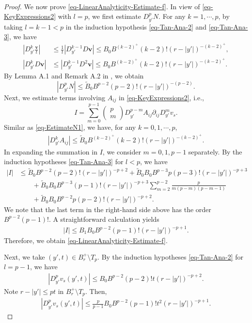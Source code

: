 \documentclass[11pt,reqno]{amsart}
\renewcommand{\leq}{\leqslant}
\theoremstyle{definition}
\numberwithin{equation}{section}
\begin{document}
\begin{proof}
We now prove \eqref{eq-LinearAnalyticity-Estimate-f}. In view of \eqref{eq-KeyExpressions2} 
with $l=p$, we first estimate $D_{y'}^pN$. 
For any $k=1, \cdots, p$, by taking $l=k-1<p$ in the induction hypothesis 
\eqref{eq-Tan-Ana-2} and \eqref{eq-Tan-Ana-3}, we have 
\begin{align}
\left|D_{y'}^k\frac{\mathbf v}{t}\right|&\leq\frac1t\left|D_{y'}^{k-1}D \mathbf v\right|
\leq B_0B^{(k-2)^+}(k-2)!(r-|y'|)^{-(k-2)^+},\\
|D_{y'}^kD \mathbf v|&\leq|D_{y'}^{k-1}D^2 \mathbf v|\leq B_0B^{(k-2)^+}(k-2)!(r-|y'|)^{-(k-2)^+}.
\end{align}
By Lemma A.1 and Remark A.2 in \cite{HanJiang1}, we obtain 
\begin{equation}\label{eq-EstimateN1}|D^p_{y'}N|\leq \widetilde B_0B^{p-2}(p-2)!(r-|y'|)^{-(p-2)}.
\end{equation}
Next, we estimate terms involving $A_{ij}$ in \eqref{eq-KeyExpressions2}, i.e., 
\begin{equation}\label{eq-estimate-I}I=\sum_{m=0}^{p-1}
\left(\begin{matrix}p\\m\end{matrix}\right)D_{y'}^{p-m}A_{ij} \partial_{ij}D_{y'}^mv_s.\end{equation}
Similar as \eqref{eq-EstimateN1}, we have, for any $k=0, 1, \cdots, p$, 
\begin{align}|D^k_{y'}A_{ij}|\leq \widetilde B_0B^{(k-2)^+}(k-2)!(r-|y'|)^{-(k-2)^+}.\end{align}
In expanding the summation in $I$, we consider $m=0, 1, p-1$ separately. 
By  the induction hypotheses 
\eqref{eq-Tan-Ana-3} for $l<p$, we have 
\begin{align} 
|I|&\leq \widetilde B_0B^{p-2}(p-2)!(r-|y'|)^{-p+2}+\widetilde B_0B_0B^{p-3}p(p-3)!(r-|y'|)^{-p+3}\\
&\qquad +\widetilde B_0B_0B^{p-3}(p-1)!(r-|y'|)^{-p+3}
\sum_{m=2}^{p-2}\frac{p}{m(p-m)(p-m-1)}\\
&\qquad+\widetilde B_0B_0B^{p-2}p(p-2)!(r-|y'|)^{-p+2}.\end{align} 
We note that the last term in the right-hand side above has the order $B^{p-2}(p-1)!$. 
A straightforward calculation yields 
\begin{align}|I|\leq B_1B_0B^{p-2}(p-1)!(r-|y'|)^{-p+1}.\end{align}
Therefore, we obtain \eqref{eq-LinearAnalyticity-Estimate-f}. 

Next, we take $(y',t)\in B^+_r\setminus T_p$. By the induction hypotheses 
\eqref{eq-Tan-Ana-2} for $l=p-1$, we have 
\begin{align}|D^p_{y'} v_s(y',t)|\leq B_0B^{p-2}(p-2)!t (r-|y'|)^{-p+2}.\end{align}
Note $r-|y'|\leq pt$ in $B^+_r\setminus T_p$. Then, 
\begin{align}|D^p_{y'} v_s(y',t)|\leq \frac{p}{p-1}B_0B^{p-2}(p-1)!t^2 (r-|y'|)^{-p+1}.\end{align}


\end{proof}
\end{document}
